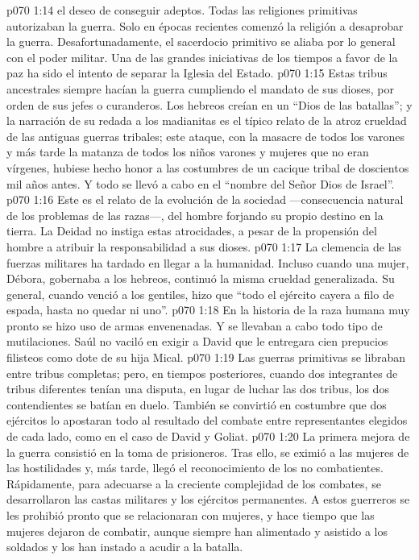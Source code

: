 \vs p070 1:14  el deseo de conseguir adeptos. Todas las religiones primitivas autorizaban la guerra. Solo en épocas recientes comenzó la religión a desaprobar la guerra. Desafortunadamente, el sacerdocio primitivo se aliaba por lo general con el poder militar. Una de las grandes iniciativas de los tiempos a favor de la paz ha sido el intento de separar la Iglesia del Estado.
\vs p070 1:15 \pc Estas tribus ancestrales siempre hacían la guerra cumpliendo el mandato de sus dioses, por orden de sus jefes o curanderos. Los hebreos creían en un “Dios de las batallas”; y la narración de su redada a los madianitas es el típico relato de la atroz crueldad de las antiguas guerras tribales; este ataque, con la masacre de todos los varones y más tarde la matanza de todos los niños varones y mujeres que no eran vírgenes, hubiese hecho honor a las costumbres de un cacique tribal de doscientos mil años antes. Y todo se llevó a cabo en el “nombre del Señor Dios de Israel”.
\vs p070 1:16 Este es el relato de la evolución de la sociedad ---consecuencia natural de los problemas de las razas---, del hombre forjando su propio destino en la tierra. La Deidad no instiga estas atrocidades, a pesar de la propensión del hombre a atribuir la responsabilidad a sus dioses.
\vs p070 1:17 \pc La clemencia de las fuerzas militares ha tardado en llegar a la humanidad. Incluso cuando una mujer, Débora, gobernaba a los hebreos, continuó la misma crueldad generalizada. Su general, cuando venció a los gentiles, hizo que “todo el ejército cayera a filo de espada, hasta no quedar ni uno”.
\vs p070 1:18 En la historia de la raza humana muy pronto se hizo uso de armas envenenadas. Y se llevaban a cabo todo tipo de mutilaciones. Saúl no vaciló en exigir a David que le entregara cien prepucios filisteos como dote de su hija Mical.
\vs p070 1:19 Las guerras primitivas se libraban entre tribus completas; pero, en tiempos posteriores, cuando dos integrantes de tribus diferentes tenían una disputa, en lugar de luchar las dos tribus, los dos contendientes se batían en duelo. También se convirtió en costumbre que dos ejércitos lo apostaran todo al resultado del combate entre representantes elegidos de cada lado, como en el caso de David y Goliat.
\vs p070 1:20 La primera mejora de la guerra consistió en la toma de prisioneros. Tras ello, se eximió a las mujeres de las hostilidades y, más tarde, llegó el reconocimiento de los no combatientes. Rápidamente, para adecuarse a la creciente complejidad de los combates, se desarrollaron las castas militares y los ejércitos permanentes. A estos guerreros se les prohibió pronto que se relacionaran con mujeres, y hace tiempo que las mujeres dejaron de combatir, aunque siempre han alimentado y asistido a los soldados y los han instado a acudir a la batalla.

